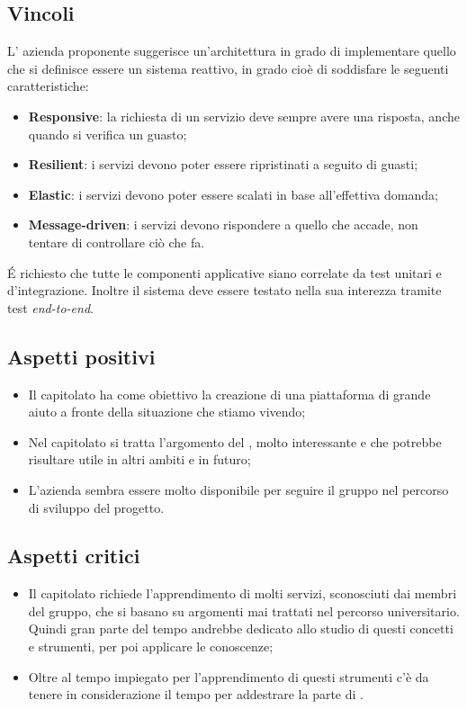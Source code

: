 \subsection{Vincoli}
L' azienda proponente suggerisce un'architettura in grado di implementare quello che si definisce essere un sistema reattivo, in grado cioè di soddisfare le seguenti caratteristiche: 
\begin{itemize}
\item \textbf{Responsive}: la richiesta di un servizio deve sempre avere una risposta, anche quando si verifica un guasto; 
\item \textbf{Resilient}: i servizi devono poter essere ripristinati a seguito di guasti; 
\item \textbf{Elastic}: i servizi devono poter essere scalati in base all'effettiva domanda; 
\item \textbf{Message-driven}: i servizi devono rispondere a quello che accade, non tentare di controllare ciò che fa.  
\end{itemize}
É richiesto che tutte le componenti applicative siano correlate da test unitari e d'integrazione. Inoltre il sistema deve essere testato nella sua interezza tramite test \textit{end-to-end}. 

\subsection{Aspetti positivi}
\begin{itemize}
\item Il capitolato ha come obiettivo la creazione di una piattaforma di grande aiuto a fronte della situazione che stiamo vivendo;
\item Nel capitolato si tratta l'argomento del , molto interessante e che potrebbe risultare utile in altri ambiti e in futuro;
\item L'azienda sembra essere molto disponibile per seguire il gruppo nel percorso di sviluppo del progetto.
\end{itemize}

\subsection{Aspetti critici}
\begin{itemize}
\item Il capitolato richiede l'apprendimento di molti servizi, sconosciuti dai membri del gruppo, che si basano su argomenti mai trattati nel percorso universitario. Quindi gran parte del tempo andrebbe dedicato allo studio di questi concetti e strumenti, per poi applicare le conoscenze;
\item Oltre al tempo impiegato per l'apprendimento di questi strumenti c'è da tenere in considerazione il tempo per addestrare la parte di .
\end{itemize}

